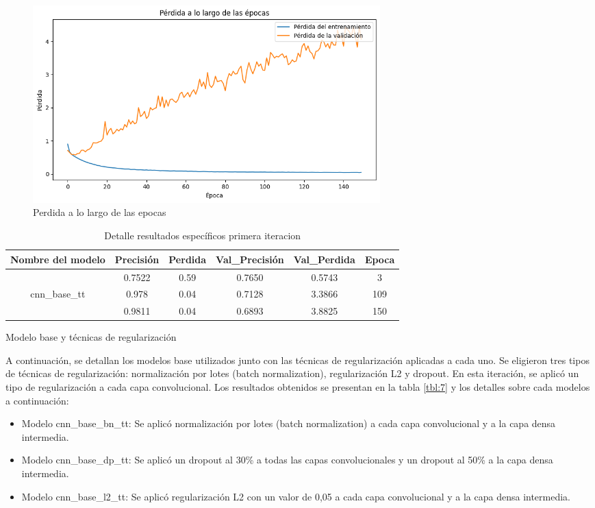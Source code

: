 \begin{figure}
	\includegraphics[width=0.65\textwidth]{capitulo5/figuras/perdida.png}
	\caption{Perdida a lo largo de las epocas}
	\label{fig:perdida}
\end{figure}

\begin{table}[!ht]
	\centering
	\begin{tabular}{|c|c|c|c|c|c|}
		\hline
		\textbf{Nombre del modelo} & \textbf{Precisión} & \textbf{Perdida} & \textbf{Val\_Precisión} & \textbf{Val\_Perdida} & \textbf{Epoca} \\ \hline
		~ & 0.7522 & 0.59 & 0.7650 & 0.5743 & 3 \\ \cline{2-6} 
		cnn\_base\_tt & 0.978 & 0.04 & 0.7128 & 3.3866 & 109 \\ \cline{2-6} 
		~ & 0.9811 & 0.04 & 0.6893 & 3.8825 & 150 \\ \hline
	\end{tabular}
	\caption{Detalle resultados específicos primera iteracion}
	\label{tbl:6}
\end{table}

Modelo base y técnicas de regularización

A continuación, se detallan los modelos base utilizados junto con las técnicas de regularización aplicadas a cada uno. Se eligieron tres tipos de técnicas de regularización: normalización por lotes (batch normalization), regularización L2 y dropout. En esta iteración, se aplicó un tipo de regularización a cada capa convolucional. Los resultados obtenidos se presentan en la tabla \ref{tbl:7} y los detalles  sobre cada modelos a continuación:

\begin{itemize}
\item Modelo cnn\_base\_bn\_tt: Se aplicó normalización por lotes (batch normalization) a cada capa convolucional y a la capa densa intermedia.
\item Modelo cnn\_base\_dp\_tt: Se aplicó un dropout al 30\% a todas las capas convolucionales y un dropout al 50\% a la capa densa intermedia.
\item Modelo cnn\_base\_l2\_tt: Se aplicó regularización L2 con un valor de 0,05 a cada capa convolucional y a la capa densa intermedia.
\end{itemize}

